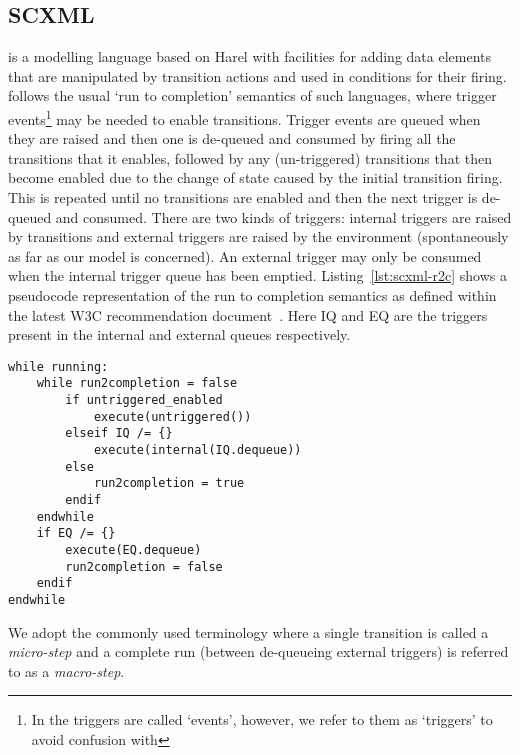 

\subsection{SCXML}
\label{sec:scxml}

\SCXML is a modelling language based on Harel \statecharts with facilities for adding data elements that are manipulated by transition actions and used in conditions for their firing. \SCXML follows the usual `run to completion' semantics of such \statechart languages, where trigger events\footnote{In \SCXML the triggers are called `events', however, we refer to them as `triggers' to avoid confusion with \EventB} may be needed to enable transitions. Trigger events are queued when they are raised and then one is de-queued and consumed by firing all the transitions that it enables, followed by any (un-triggered) transitions that then become enabled due to the change of state caused by the initial transition firing. This is repeated until no transitions are enabled and then the next trigger is de-queued and consumed. There are two kinds of triggers: internal triggers are raised by transitions and external triggers are raised by the environment (spontaneously as far as our model is concerned). An external trigger may only be consumed when the internal trigger queue has been emptied. Listing~\ref{lst:scxml-r2c} shows a pseudocode representation of the run to completion semantics as defined within the latest W3C recommendation document~\cite{scxmlwebsite}. Here IQ and EQ are the triggers present in the internal and external queues respectively. 

\begin{lstlisting}[caption=Pseudocode for 'run to completion',label={lst:scxml-r2c}, frame=single]
while running:
	while run2completion = false
		if untriggered_enabled
			execute(untriggered())
		elseif IQ /= {}
			execute(internal(IQ.dequeue)) 
		else
			run2completion = true
		endif
	endwhile
	if EQ /= {}
		execute(EQ.dequeue) 
		run2completion = false
	endif
endwhile 
\end{lstlisting}

We adopt the commonly used terminology where a single transition is called a \emph{micro-step} and a complete run (between de-queueing external triggers) is referred to as a \emph{macro-step}.


